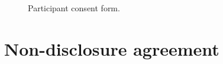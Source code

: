 \documentclass[draft]{scrartcl}
\begin{document}
\begin{figure}[h]
  \begin{center}
  \end{center}
  \caption{Participant consent form.}
  \label{participantconsent}
\end{figure}

\clearpage
\section{Non-disclosure agreement}
\label{sec:nda}
\end{document}
